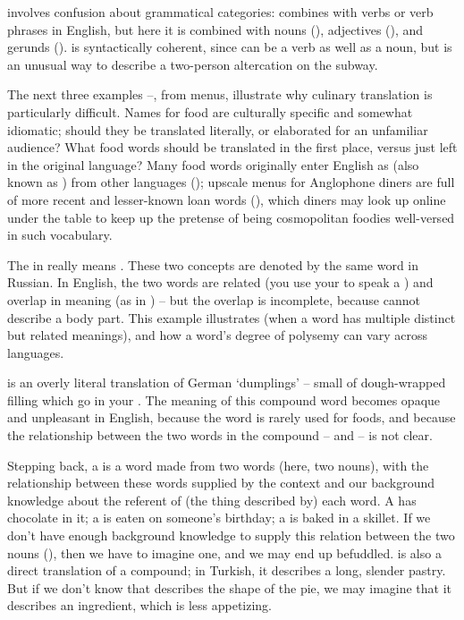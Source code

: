  involves confusion about grammatical categories:  combines with verbs or verb phrases in English, but here it is combined with nouns (), adjectives (), and gerunds ().   is syntactically coherent, since  can be a verb as well as a noun, but  is an unusual way to describe a two-person altercation on the subway.

The next three examples --, from menus, illustrate why culinary translation is particularly difficult.  Names for food are culturally specific and somewhat idiomatic; should they be translated literally, or elaborated for an unfamiliar audience?  What food words should be translated in the first place, versus just left in the original language?  Many food words originally enter English as  (also known as ) from other languages (); upscale menus for  Anglophone diners are full of more recent and lesser-known loan words (), which diners may look up online under the table to keep up the pretense of being cosmopolitan foodies well-versed in such vocabulary.

The  in  really means .  These two concepts are denoted by the same word in Russian.  In English, the two words are related (you use your  to speak a ) and overlap in meaning (as in ) -- but the overlap is incomplete, because  cannot describe a body part.   This example illustrates  (when a word has multiple distinct but related meanings), and how a word's degree of polysemy can vary across languages.

  is an overly literal translation of German  `dumplings' --   small  of dough-wrapped filling  which go in your .   The meaning of this compound word becomes opaque and unpleasant in English,  because the word  is rarely used for foods, and because the relationship between the two words in the compound --  and  -- is not clear.  

Stepping back, a  is a word made from two words (here, two nouns), with the relationship between these words supplied by the context and our background knowledge about the referent of (the thing described by) each word.  A   has chocolate in it; a  is eaten on someone's birthday; a  is baked in a skillet. If we don't have enough background knowledge to supply this relation between the two nouns (), then we have to imagine one, and we may end up befuddled.    is also a direct translation of a compound; in Turkish, it describes a long, slender pastry.  But if we don't know that  describes the shape of the pie, we may imagine that it describes an ingredient, which is less appetizing.

